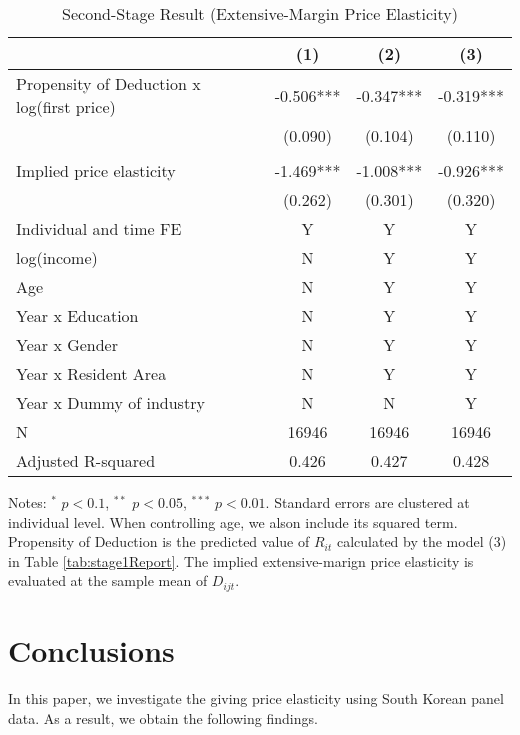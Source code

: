 \documentclass[
  11pt,
  a4paper,
]{article}
\begin{document}
\begin{table}

\caption{\label{tab:ExtensiveReport}Second-Stage Result (Extensive-Margin Price Elasticity)}
\centering
\fontsize{9}{11}\selectfont
\begin{threeparttable}
\begin{tabular}[t]{lccc}
\toprule
 & (1) & (2) & (3)\\
\midrule
Propensity of Deduction x log(first price) & -0.506*** & -0.347*** & -0.319***\\
 & (0.090) & (0.104) & (0.110)\\
 &  &  & \\
Implied price elasticity & -1.469*** & -1.008*** & -0.926***\\
 & (0.262) & (0.301) & (0.320)\\
Individual and time FE & Y & Y & Y\\
log(income) & N & Y & Y\\
Age & N & Y & Y\\
Year x Education & N & Y & Y\\
Year x Gender & N & Y & Y\\
Year x Resident Area & N & Y & Y\\
Year x Dummy of industry & N & N & Y\\
N & 16946 & 16946 & 16946\\
Adjusted R-squared & 0.426 & 0.427 & 0.428\\
\bottomrule
\end{tabular}
\begin{tablenotes}
\item Notes: $^{*}$ $p < 0.1$, $^{**}$ $p < 0.05$, $^{***}$ $p < 0.01$. Standard errors are clustered at individual level. When controlling age, we alson include its squared term. Propensity of Deduction is the predicted value of $R_{it}$ calculated by the model (3) in Table \ref{tab:stage1Report}. The implied extensive-marign price elasticity is evaluated at the sample mean of $D_{ijt}$.
\end{tablenotes}
\end{threeparttable}
\end{table}

\hypertarget{conclusions}{%
\section{Conclusions}\label{conclusions}}

In this paper, we investigate the giving price elasticity using South Korean panel data. As a result, we obtain the following findings.
\end{document}
